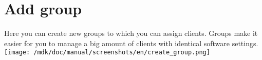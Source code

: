 \section{Add group}Here you can create new groups to which you can assign clients. Groups make it easier for you to manage a big amount of clients with identical software settings.\\
\texttt{[image: /mdk/doc/manual/screenshots/en/create\_group.png]} \\
